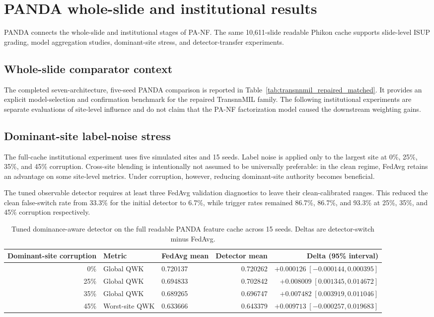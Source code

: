 \section{PANDA whole-slide and institutional results}

PANDA \cite{bulten2022panda} connects the whole-slide and institutional stages of PA-NF. The same 10,611-slide readable Phikon cache supports slide-level ISUP grading, model aggregation studies, dominant-site stress, and detector-transfer experiments.

\subsection{Whole-slide comparator context}
The completed seven-architecture, five-seed PANDA comparison is reported in Table~\ref{tab:transnnmil_repaired_matched}. It provides an explicit model-selection and confirmation benchmark for the repaired TransnnMIL family. The following institutional experiments are separate evaluations of site-level influence and do not claim that the PA-NF factorization model caused the downstream weighting gains.

\subsection{Dominant-site label-noise stress}
The full-cache institutional experiment uses five simulated sites and 15 seeds. Label noise is applied only to the largest site at 0\%, 25\%, 35\%, and 45\% corruption. Cross-site blending is intentionally not assumed to be universally preferable: in the clean regime, FedAvg retains an advantage on some site-level metrics. Under corruption, however, reducing dominant-site authority becomes beneficial.

The tuned observable detector requires at least three FedAvg validation diagnostics to leave their clean-calibrated ranges. This reduced the clean false-switch rate from 33.3\% for the initial detector to 6.7\%, while trigger rates remained 86.7\%, 86.7\%, and 93.3\% at 25\%, 35\%, and 45\% corruption respectively.

\begin{table}[t]
\centering
\caption{Tuned dominance-aware detector on the full readable PANDA feature cache across 15 seeds. Deltas are detector-switch minus FedAvg.}
\label{tab:panda_detector}
\small
\begin{tabular}{rllrr}
\toprule
Dominant-site corruption & Metric & FedAvg mean & Detector mean & Delta (95\% interval) \\
\midrule
0\% & Global QWK & 0.720137 & 0.720262 & $+0.000126\;[-0.000144,0.000395]$ \\
25\% & Global QWK & 0.694833 & 0.702842 & $+0.008009\;[0.001345,0.014672]$ \\
35\% & Global QWK & 0.689265 & 0.696747 & $+0.007482\;[0.003919,0.011046]$ \\
45\% & Worst-site QWK & 0.633666 & 0.643379 & $+0.009713\;[-0.000257,0.019683]$ \\
\bottomrule
\end{tabular}
\end{table}

